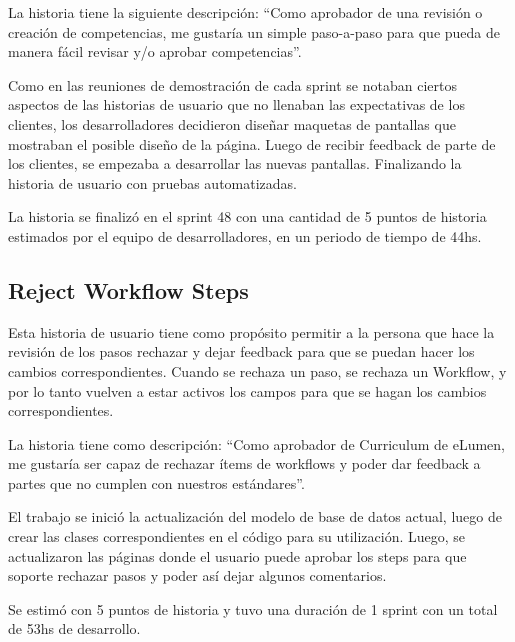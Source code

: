 La historia tiene la siguiente descripción: “Como aprobador de una revisión o creación de competencias, me gustaría un simple paso-a-paso para que pueda de manera fácil revisar y/o aprobar competencias”.

Como en las reuniones de demostración de cada sprint se notaban ciertos aspectos de las historias de usuario que no llenaban las expectativas de los clientes, los desarrolladores decidieron diseñar maquetas de pantallas que mostraban el posible diseño de la página. Luego de recibir feedback de parte de los clientes, se empezaba a desarrollar las nuevas pantallas. Finalizando la historia de usuario con pruebas automatizadas.

La historia se finalizó en el sprint 48 con una cantidad de 5 puntos de historia estimados por el equipo de desarrolladores, en un periodo de tiempo de 44hs.

\subsection{Reject Workflow Steps}
Esta historia de usuario tiene como propósito permitir a la persona que hace la revisión de los pasos rechazar y dejar feedback para que se puedan hacer los cambios correspondientes. Cuando se rechaza un paso, se rechaza un Workflow, y por lo tanto vuelven a estar activos los campos para que se hagan los cambios correspondientes.

La historia tiene como descripción: “Como aprobador de Curriculum de eLumen, me gustaría ser capaz de rechazar ítems de workflows y poder dar feedback a partes que no cumplen con nuestros estándares”.

El trabajo se inició la actualización del modelo de base de datos actual, luego de crear las clases correspondientes en el código para su utilización. Luego, se actualizaron las páginas donde el usuario puede aprobar los steps para que soporte rechazar pasos y poder así dejar algunos comentarios. 

Se estimó con 5 puntos de historia y tuvo una duración de 1 sprint con un total de 53hs de desarrollo.
